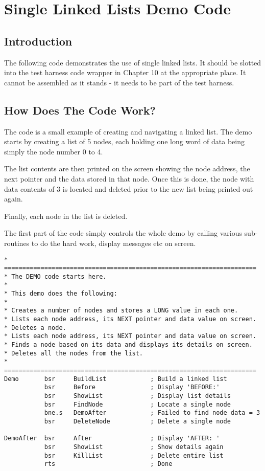 \chapter{Single Linked Lists Demo Code}
 
\section{Introduction}
\label{ch11-intro}%

The following code demonstrates the use of single linked lists. It
    should be slotted into the test harness code wrapper in Chapter 10 at the
    appropriate place. It cannot be assembled as it stands -{} it needs to be
    part of the test harness.

\section{How Does The Code Work?}
\label{ch11-single-code}%

The code is a small example of creating and navigating a linked
    list. The demo starts by creating a list of 5 nodes, each holding one long
    word of data being simply the node number 0 to 4.

The list contents are then printed on the screen showing the node
    address, the next pointer and the data stored in that node. Once this is
    done, the node with data contents of 3 is located and deleted prior to the
    new list being printed out again.

Finally, each node in the list is deleted.

The first part of the code simply controls the whole demo by calling
    various sub-{}routines to do the hard work, display messages etc on
    screen.

\begin{lstlisting}[firstnumber=1,caption={Single Linked List - Demo Code}]
* =====================================================================
* The DEMO code starts here.
*
* This demo does the following:
*
* Creates a number of nodes and stores a LONG value in each one.
* Lists each node address, its NEXT pointer and data value on screen.
* Deletes a node.
* Lists each node address, its NEXT pointer and data value on screen.
* Finds a node based on its data and displays its details on screen.
* Deletes all the nodes from the list.
* =====================================================================
Demo       bsr     BuildList            ; Build a linked list
           bsr     Before               ; Display 'BEFORE:'
           bsr     ShowList             ; Display list details
           bsr     FindNode             ; Locate a single node
           bne.s   DemoAfter            ; Failed to find node data = 3
           bsr     DeleteNode           ; Delete a single node

DemoAfter  bsr     After                ; Display 'AFTER: '
           bsr     ShowList             ; Show details again
           bsr     KillList             ; Delete entire list
           rts                          ; Done
\end{lstlisting}

